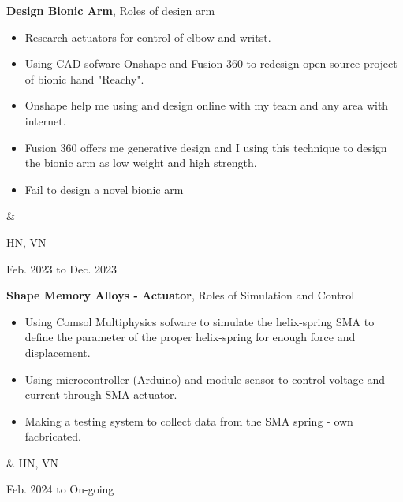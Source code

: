 \documentclass[10pt, letterpaper]{article}
\newenvironment{highlights}{
        \begin{itemize}[
                topsep=0pt,
                parsep=0.10 cm,
                partopsep=0pt,
                itemsep=0pt,
                after=\vspace{-1\baselineskip},
                leftmargin=0.4 cm + 3pt
            ]
    }{
        \end{itemize}
    } %
\let\originalTabularx\tabularx
\let\originalEndTabularx\endtabularx
\renewenvironment{tabularx}{\bgroup\centering\originalTabularx}{\originalEndTabularx\par\egroup}
\begin{document}
        \begin{tabularx}{
            \textwidth-0.4 cm-0.13cm
        }{
            K{0.2 cm}
            R{4.1 cm}
        }
            \textbf{Design Bionic Arm}, Roles of design arm

            \vspace{0.10 cm}

            \begin{highlights}
                \item Research actuators for control of elbow and writst.
                \item Using CAD sofware Onshape and Fusion 360 to redesign open source project of bionic hand "Reachy".
                \item Onshape help me using and design online with my team and any area with internet.
                \item Fusion 360 offers me generative design and I using this technique to design the bionic arm as low weight and high strength.
                \item Fail to design a novel bionic arm 
            \end{highlights}
            &

            HN, VN 
            
            Feb. 2023 to Dec. 2023

        \end{tabularx}

        \vspace{0.2 cm}
        \begin{tabularx}{
            \textwidth-0.4 cm-0.13cm
        }{
            K{0.2 cm}
            R{4.1 cm}
        }
            \textbf{Shape Memory Alloys - Actuator}, Roles of Simulation and Control

            \vspace{0.10 cm}

            \begin{highlights}
                \item Using Comsol Multiphysics sofware to simulate the helix-spring SMA to define the 
                parameter of the proper helix-spring for enough force and displacement.
                \item Using microcontroller (Arduino) and module sensor to control voltage and current through SMA actuator.
                \item Making a testing system to collect data from the SMA spring - own facbricated.
            \end{highlights}
            &
            HN, VN

            Feb. 2024 to On-going
        \end{tabularx}
\end{document}
